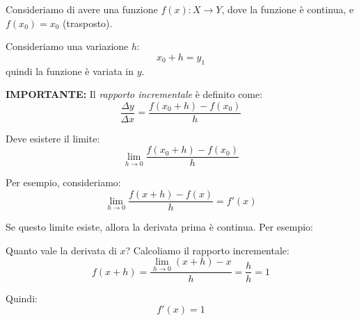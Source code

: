 \documentclass[12pt]{article}
\begin{document}
\Huge

Consideriamo di avere una funzione \( f(x): X \to Y \), dove la funzione è continua, e \( f(x_0) = x_0 \) (trasposto).

\vspace{0.5cm}

Consideriamo una variazione \( h \): 
\[
x_0 + h = y_1
\]
quindi la funzione è variata in \( y \).

\vspace{0.5cm}

\textbf{IMPORTANTE:} Il \textit{rapporto incrementale} è definito come: 
\[
\frac{\Delta y}{\Delta x} = \frac{f(x_0 + h) - f(x_0)}{h}
\]

Deve esistere il limite:
\[
\lim_{h \to 0} \frac{f(x_0 + h) - f(x_0)}{h}
\]

\vspace{0.5cm}

Per esempio, consideriamo:
\[
\lim_{h \to 0} \frac{f(x + h) - f(x)}{h} = f'(x)
\]

Se questo limite esiste, allora la derivata prima è continua. Per esempio:

\vspace{0.5cm}

Quanto vale la derivata di \( x \)? Calcoliamo il rapporto incrementale:
\[
f(x + h) = \frac{\lim_{h \to 0} (x + h) - x}{h} = \frac{h}{h} = 1
\]

Quindi:
\[
f'(x) = 1
\]
\end{document}
